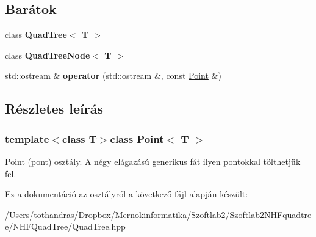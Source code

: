 \subsection*{Barátok}
\begin{DoxyCompactItemize}
\item 
\hypertarget{class_point_a86cf92e1bfbee775eead8ccd7dbdc1f8}{class {\bfseries Quad\-Tree$<$ T $>$}}\label{class_point_a86cf92e1bfbee775eead8ccd7dbdc1f8}

\item 
\hypertarget{class_point_ac17a5caf43217c772028859f0dd9036e}{class {\bfseries Quad\-Tree\-Node$<$ T $>$}}\label{class_point_ac17a5caf43217c772028859f0dd9036e}

\item 
\hypertarget{class_point_a7ac667276b1cffd66906f337de0b9fba}{std\-::ostream \& {\bfseries operator} (std\-::ostream \&, const \hyperlink{class_point}{Point} \&)}\label{class_point_a7ac667276b1cffd66906f337de0b9fba}

\end{DoxyCompactItemize}


\subsection{Részletes leírás}
\subsubsection*{template$<$class T$>$class Point$<$ T $>$}

\hyperlink{class_point}{Point} (pont) osztály. A négy elágazású generikus fát ilyen pontokkal tölthetjük fel. 

Ez a dokumentáció az osztályról a következő fájl alapján készült\-:\begin{DoxyCompactItemize}
\item 
/\-Users/tothandras/\-Dropbox/\-Mernokinformatika/\-Szoftlab2/\-Szoftlab2\-N\-H\-Fquadtree/\-N\-H\-F\-Quad\-Tree/Quad\-Tree.\-hpp\end{DoxyCompactItemize}
